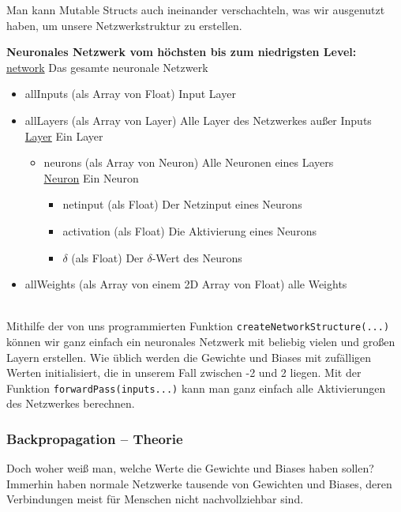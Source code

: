 \documentclass[11pt, a4paper, ngerman]{article}
\begin{document}
		Man kann Mutable Structs auch ineinander verschachteln, was wir ausgenutzt haben, um unsere Netzwerkstruktur zu erstellen.\\[1.5ex]
		\begin{minipage}{\textwidth}
			\textbf{Neuronales Netzwerk vom höchsten bis zum niedrigsten Level:}\\[1ex]
			\underline{network} \textrightarrow Das gesamte neuronale Netzwerk
			\begin{itemize}
				\item allInputs (als Array von Float) \textrightarrow Input Layer
				\item allLayers (als Array von Layer) \textrightarrow Alle Layer des Netzwerkes außer Inputs\\\underline{Layer} \textrightarrow Ein Layer
				\begin{itemize}
					\item neurons (als Array von Neuron) \textrightarrow Alle Neuronen eines Layers\\\underline{Neuron} \textrightarrow Ein Neuron
					\begin{itemize}
						\item netinput (als Float) \textrightarrow Der Netzinput eines Neurons
						\item activation (als Float) \textrightarrow Die Aktivierung eines Neurons
						\item $\delta$ (als Float) \textrightarrow Der $\delta$-Wert des Neurons
					\end{itemize}
				\end{itemize}
				\item allWeights (als Array von einem 2D Array von Float) \textrightarrow alle Weights 
			\end{itemize}
		\end{minipage}\\
	
		Mithilfe der von uns programmierten Funktion \texttt{createNetworkStructure(...)} können wir ganz einfach ein neuronales Netzwerk mit beliebig vielen und großen Layern erstellen. Wie üblich werden die Gewichte und Biases mit zufälligen Werten initialisiert, die in unserem Fall zwischen -2 und 2 liegen. Mit der Funktion \texttt{forwardPass(inputs...)} kann man ganz einfach alle Aktivierungen des Netzwerkes berechnen.
		
		\subsubsection{Backpropagation -- Theorie} \label{Backpropagation - Theorie}
		Doch woher weiß man, welche Werte die Gewichte und Biases haben sollen? Immerhin haben normale Netzwerke tausende von Gewichten und Biases, deren Verbindungen meist für Menschen nicht nachvollziehbar sind.
		
\end{document}
